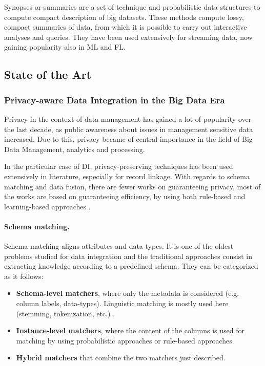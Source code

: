 \documentclass[12pt]{article}
\begin{document}
Synopses or summaries are a set of technique and probabilistic data structures to compute compact description of big datasets. 
These methods compute lossy, compact summaries of data, from which it is possible to carry out interactive analyses and queries. 
They have been used extensively for streaming data, now gaining popularity also in ML and FL.

\subsection{State of the Art}
\subsubsection{Privacy-aware Data Integration in the Big Data Era}
Privacy in the context of data management has gained a lot of popularity over the last decade, as public awareness about 
issues in management sensitive data increased. Due to this, privacy became of central importance in the field of Big Data 
Management, analytics and processing.

In the particular case of DI, privacy-preserving techniques
has been used extensively in literature, especially for record linkage. %
With regards to schema matching and data fusion, there are fewer works on guaranteeing privacy, most of the works are based on guaranteeing efficiency, by using 
both rule-based and learning-based approaches \cite*{Riedel2013}.


\paragraph{Schema matching.}
Schema matching aligns attributes and data types. It is one of the oldest problems studied for data integration and the 
traditional approaches consist in extracting knowledge according to a predefined schema. They can be categorized as it follows:
\begin{itemize}
   \item \textbf{Schema-level matchers}, where only the metadata is considered (e.g. column labels, data-types). Linguistic matching is mostly used here (stemming, tokenization, etc.) \cite*{Bernstein2011}.
   \item \textbf{Instance-level matchers}, where the content of the columns is used for matching by using probabilistic approaches \cite*{Dasu2002} or rule-based approaches.
   \item \textbf{Hybrid matchers} that combine the two matchers just described.
\end{itemize}
\end{document}
